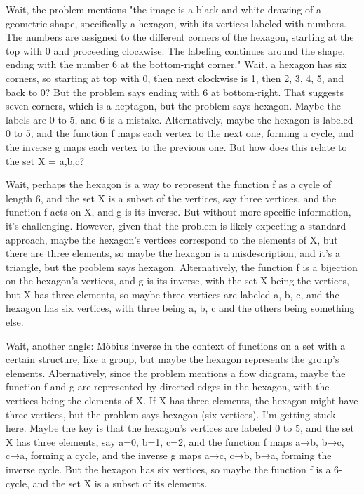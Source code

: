 Wait, the problem mentions "the image is a black and white drawing of a geometric shape, specifically a hexagon, with its vertices labeled with numbers. The numbers are assigned to the different corners of the hexagon, starting at the top with 0 and proceeding clockwise. The labeling continues around the shape, ending with the number 6 at the bottom-right corner." Wait, a hexagon has six corners, so starting at top with 0, then next clockwise is 1, then 2, 3, 4, 5, and back to 0? But the problem says ending with 6 at bottom-right. That suggests seven corners, which is a heptagon, but the problem says hexagon. Maybe the labels are 0 to 5, and 6 is a mistake. Alternatively, maybe the hexagon is labeled 0 to 5, and the function f maps each vertex to the next one, forming a cycle, and the inverse g maps each vertex to the previous one. But how does this relate to the set X = {a,b,c}?

Wait, perhaps the hexagon is a way to represent the function f as a cycle of length 6, and the set X is a subset of the vertices, say three vertices, and the function f acts on X, and g is its inverse. But without more specific information, it's challenging. However, given that the problem is likely expecting a standard approach, maybe the hexagon's vertices correspond to the elements of X, but there are three elements, so maybe the hexagon is a misdescription, and it's a triangle, but the problem says hexagon. Alternatively, the function f is a bijection on the hexagon's vertices, and g is its inverse, with the set X being the vertices, but X has three elements, so maybe three vertices are labeled a, b, c, and the hexagon has six vertices, with three being a, b, c and the others being something else. 

Wait, another angle: Möbius inverse in the context of functions on a set with a certain structure, like a group, but maybe the hexagon represents the group's elements. Alternatively, since the problem mentions a flow diagram, maybe the function f and g are represented by directed edges in the hexagon, with the vertices being the elements of X. If X has three elements, the hexagon might have three vertices, but the problem says hexagon (six vertices). I'm getting stuck here. Maybe the key is that the hexagon's vertices are labeled 0 to 5, and the set X has three elements, say a=0, b=1, c=2, and the function f maps a→b, b→c, c→a, forming a cycle, and the inverse g maps a→c, c→b, b→a, forming the inverse cycle. But the hexagon has six vertices, so maybe the function f is a 6-cycle, and the set X is a subset of its elements. 

